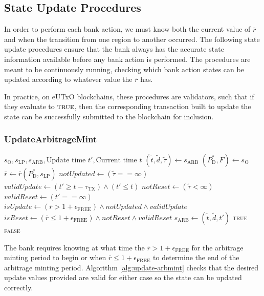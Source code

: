 \documentclass{ifcolog}
\newcommand{\Pdt}{P_{\mathrm{D}}^{*}}
\newcommand{\rr}{\bar{r}}
\newcommand{\slp}{s_{\mathrm{LP}}}
\newcommand{\soracle}{s_{\textrm{O}}}
\newcommand{\sarb}{s_{\textrm{ARB}}}
\newcommand{\tautx}{\tau_{\textrm{TX}}}
\newcommand{\epsilonfree}{\epsilon_{\textrm{FREE}}}
\begin{document}
\newpage

\subsection{State Update Procedures}

In order to perform each bank action, we must know both the current value of $\rr$ and when
the transition from one region to another occurred. The following state update procedures ensure
that the bank always has the accurate state information available before any bank action is performed.
The procedures are meant to be continuously running, checking which bank action states can be updated
according to whatever value the $\rr$ has. 

In practice, on eUTxO \cite{EUTXO} blockchains, these procedures are validators, such that if they evaluate to $\textsc{true}$,
then the corresponding transaction built to update the state can be successfully submitted to the blockchain for inclusion.

\subsubsection{UpdateArbitrageMint}

\begin{algorithm}
\caption{UpdateArbitrageMint}\label{alg:update-arbmint}
\begin{algorithmic}[1]
\Require $\soracle, \slp, \sarb, \textrm{Update time } t', \textrm{Current time } t$
\State $(\tilde{t}, \tilde{d}, \tilde{\tau}) \gets \sarb$
\State $(\Pdt, F) \gets \soracle$
\State $\rr \gets \rr(\Pdt, \slp)$
\State $notUpdated \gets (\tilde{\tau} == \infty)$
\State $validUpdate \gets (t' \ge t - \tautx) \land (t' \le t)$ 
\State $notReset \gets (\tilde{\tau} < \infty)$
\State $validReset \gets (t' == \infty)$
\State $isUpdate \gets (\rr > 1  + \epsilonfree) \land notUpdated \land validUpdate$ 
\State $isReset \gets (\rr \le 1 + \epsilonfree) \land notReset \land validReset$
  \State $\sarb \gets (\tilde{t}, \tilde{d}, t')$
  \State \Return \textsc{true}
\Else
  \State \Return \textsc{false}
\EndIf
\end{algorithmic}
\end{algorithm}

The bank requires knowing at what time the $\rr > 1 + \epsilonfree$ for the arbitrage minting period to begin 
or when $\rr \le 1 + \epsilonfree$ to determine the end of the arbitrage minting period. 
Algorithm \ref{alg:update-arbmint} checks that the desired update values provided are valid for either case so the state 
can be updated correctly.
\end{document}

